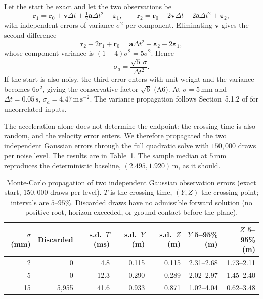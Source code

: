 \documentclass[11pt,a4paper]{article}
\begin{document}
Let the start be exact and let the two observations be
\begin{equation}
  \mathbf{r}_1=\mathbf{r}_0+\mathbf{v}\Delta t+\tfrac12\mathbf{a}\Delta t^2+\boldsymbol{\varepsilon}_1,
  \qquad
  \mathbf{r}_2=\mathbf{r}_0+2\mathbf{v}\Delta t+2\mathbf{a}\Delta t^2+\boldsymbol{\varepsilon}_2,
\end{equation}
with independent errors of variance $\sigma^2$ per component. Eliminating $\mathbf{v}$ gives the second difference
\begin{equation}
  \mathbf{r}_2-2\mathbf{r}_1+\mathbf{r}_0
  =\mathbf{a}\Delta t^2+\boldsymbol{\varepsilon}_2-2\boldsymbol{\varepsilon}_1,
\end{equation}
whose component variance is $(1+4)\sigma^2=5\sigma^2$. Hence
\begin{equation}
  \sigma_a=\frac{\sqrt{5}\,\sigma}{\Delta t^2}.
  \label{eq:sigmaa}
\end{equation}
If the start is also noisy, the third error enters with unit weight and the variance becomes $6\sigma^2$, giving the conservative factor $\sqrt{6}$ (A6). At $\sigma=5\,\mathrm{mm}$ and $\Delta t=0.05\,\mathrm{s}$, $\sigma_a=4.47\,\mathrm{m\,s^{-2}}$. The variance propagation follows Section~5.1.2 of \cite{gum2008} for uncorrelated inputs.

The acceleration alone does not determine the endpoint: the crossing time is also random, and the velocity error enters. We therefore propagated the two independent Gaussian errors through the full quadratic solve with $150{,}000$ draws per noise level. The results are in Table~\ref{tab:noise}. The sample median at $5\,\mathrm{mm}$ reproduces the deterministic baseline, $(2.495,1.920)\,\mathrm{m}$, as it should.

\begin{table}[htbp]
  \centering
  \small
  \caption{Monte-Carlo propagation of two independent Gaussian observation errors (exact start, $150{,}000$ draws per level). $T$ is the crossing time, $(Y,Z)$ the crossing point; intervals are $5$--$95\%$. Discarded draws have no admissible forward solution (no positive root, horizon exceeded, or ground contact before the plane).}
  \label{tab:noise}
  \begin{tabular}{rrrrrrr}
    \toprule
    $\sigma$ (mm) & Discarded & s.d.\ $T$ (ms) & s.d.\ $Y$ (m) & s.d.\ $Z$ (m) & $Y$ 5--95\% (m) & $Z$ 5--95\% (m) \\
    \midrule
    2  & 0     & 4.8  & 0.115 & 0.115 & 2.31--2.68 & 1.73--2.11 \\
    5  & 0     & 12.3 & 0.290 & 0.289 & 2.02--2.97 & 1.45--2.40 \\
    15 & 5{,}955 & 41.6 & 0.933 & 0.871 & 1.02--4.04 & 0.62--3.48 \\
    \bottomrule
  \end{tabular}
\end{table}
\end{document}

